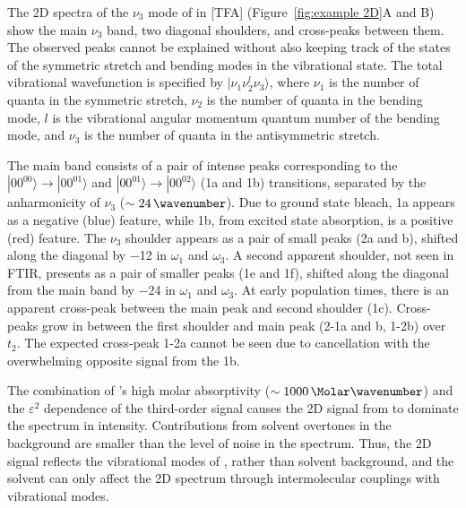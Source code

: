 \documentclass[%
  class = book,%
  crop = false,%
  float = true,%
  multi = true,%
  preview = false,%
]{standalone}
\begin{document}
{The 2D spectra of the \(\nu_3\) mode of  in \ce{[Im_{4,1}]}[TFA] (Figure~\ref{fig:example 2D}A and B) show the main \(\nu_3\) band, two diagonal shoulders, and cross-peaks between them. The observed peaks cannot be explained without also keeping track of the states of the  symmetric stretch and bending modes in the vibrational state. The total vibrational wavefunction is specified by $|\nu_1 \nu_2^l \nu_3 \rangle$, where \(\nu_1\) is the number of quanta in the symmetric stretch, \(\nu_2\) is the number of quanta in the bending mode, $l$ is the vibrational angular momentum quantum number of the bending mode, and \(\nu_3\) is the number of quanta in the antisymmetric stretch.

The main band consists of a pair of intense peaks corresponding to the $|00^00\rangle\rightarrow|00^01\rangle$  and $|00^01\rangle\rightarrow|00^02\rangle$ (1a and 1b) transitions, separated by the anharmonicity of \(\nu_3\) (\(\sim \SI{24}{\wavenumber}\)). Due to ground state bleach, 1a appears as a negative (blue) feature, while 1b, from excited state absorption, is a positive (red) feature. The \(\nu_3\) shoulder appears as a pair of small peaks (2a and b), shifted along the diagonal by \SI{-12}{\wavenumber} in \(\omega_1\) and \(\omega_3\). A second apparent shoulder, not seen in FTIR, presents as a pair of smaller peaks (1e and 1f), shifted along the diagonal from the main band by \SI{-24}{\wavenumber} in \(\omega_1\) and \(\omega_3\). At early population times, there is an apparent cross-peak between the main peak and second shoulder (1c). Cross-peaks grow in between the first shoulder and main peak (2-1a and b, 1-2b) over \(t_2\). The expected cross-peak 1-2a cannot be seen due to cancellation with the overwhelming opposite signal from the 1b.

The combination of 's high molar absorptivity (\(\sim \SI{1000}{\per\Molar\wavenumber}\)) and the \(\varepsilon^2\) dependence of the third-order signal causes the 2D signal from  to dominate the spectrum in intensity. Contributions from solvent overtones in the background are smaller than the level of noise in the spectrum. Thus, the 2D signal reflects the vibrational modes of , rather than solvent background, and the solvent can only affect the 2D spectrum through intermolecular couplings with  vibrational modes.

}
\end{document}
